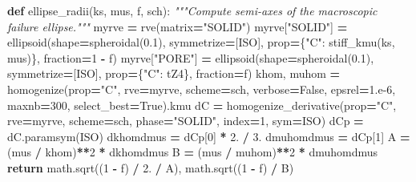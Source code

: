 \documentclass[
  a4paper,
  numbers=noendperiod,
  DIV=12]{scrreprt}
\newenvironment{Shaded}{\begin{snugshade}}{\end{snugshade}}
\newcommand{\CommentTok}[1]{\textcolor[rgb]{0.56,0.35,0.01}{\textit{#1}}}
\newcommand{\ControlFlowTok}[1]{\textcolor[rgb]{0.13,0.29,0.53}{\textbf{#1}}}
\newcommand{\DecValTok}[1]{\textcolor[rgb]{0.00,0.00,0.81}{#1}}
\newcommand{\FloatTok}[1]{\textcolor[rgb]{0.00,0.00,0.81}{#1}}
\newcommand{\KeywordTok}[1]{\textcolor[rgb]{0.13,0.29,0.53}{\textbf{#1}}}
\newcommand{\NormalTok}[1]{#1}
\newcommand{\OperatorTok}[1]{\textcolor[rgb]{0.81,0.36,0.00}{\textbf{#1}}}
\newcommand{\StringTok}[1]{\textcolor[rgb]{0.31,0.60,0.02}{#1}}
\newcommand{\VariableTok}[1]{\textcolor[rgb]{0.00,0.00,0.00}{#1}}
\begin{document}
\begin{Shaded}
\begin{Highlighting}[]
\KeywordTok{def}\NormalTok{ ellipse\_radii(ks, mus, f, sch):}
    \CommentTok{"""Compute semi{-}axes of the macroscopic failure ellipse."""}
\NormalTok{    myrve }\OperatorTok{=}\NormalTok{ rve(matrix}\OperatorTok{=}\StringTok{"SOLID"}\NormalTok{)}
\NormalTok{    myrve[}\StringTok{"SOLID"}\NormalTok{] }\OperatorTok{=}\NormalTok{ ellipsoid(shape}\OperatorTok{=}\NormalTok{spheroidal(}\FloatTok{0.1}\NormalTok{), symmetrize}\OperatorTok{=}\NormalTok{[ISO],}
\NormalTok{                               prop}\OperatorTok{=}\NormalTok{\{}\StringTok{"C"}\NormalTok{: stiff\_kmu(ks, mus)\}, fraction}\OperatorTok{=}\DecValTok{1} \OperatorTok{{-}}\NormalTok{ f)}
\NormalTok{    myrve[}\StringTok{"PORE"}\NormalTok{] }\OperatorTok{=}\NormalTok{ ellipsoid(shape}\OperatorTok{=}\NormalTok{spheroidal(}\FloatTok{0.1}\NormalTok{), symmetrize}\OperatorTok{=}\NormalTok{[ISO],}
\NormalTok{                              prop}\OperatorTok{=}\NormalTok{\{}\StringTok{"C"}\NormalTok{: tZ4\}, fraction}\OperatorTok{=}\NormalTok{f)}
\NormalTok{    khom, muhom }\OperatorTok{=}\NormalTok{ homogenize(prop}\OperatorTok{=}\StringTok{"C"}\NormalTok{, rve}\OperatorTok{=}\NormalTok{myrve, scheme}\OperatorTok{=}\NormalTok{sch,}
\NormalTok{                             verbose}\OperatorTok{=}\VariableTok{False}\NormalTok{, epsrel}\OperatorTok{=}\FloatTok{1.e{-}6}\NormalTok{, maxnb}\OperatorTok{=}\DecValTok{300}\NormalTok{,}
\NormalTok{                             select\_best}\OperatorTok{=}\VariableTok{True}\NormalTok{).kmu}
\NormalTok{    dC }\OperatorTok{=}\NormalTok{ homogenize\_derivative(prop}\OperatorTok{=}\StringTok{"C"}\NormalTok{, rve}\OperatorTok{=}\NormalTok{myrve, scheme}\OperatorTok{=}\NormalTok{sch,}
\NormalTok{                               phase}\OperatorTok{=}\StringTok{"SOLID"}\NormalTok{, index}\OperatorTok{=}\DecValTok{1}\NormalTok{, sym}\OperatorTok{=}\NormalTok{ISO)}
\NormalTok{    dCp }\OperatorTok{=}\NormalTok{ dC.paramsym(ISO)}
\NormalTok{    dkhomdmus }\OperatorTok{=}\NormalTok{ dCp[}\DecValTok{0}\NormalTok{] }\OperatorTok{*} \FloatTok{2.} \OperatorTok{/} \FloatTok{3.}
\NormalTok{    dmuhomdmus }\OperatorTok{=}\NormalTok{ dCp[}\DecValTok{1}\NormalTok{]}
\NormalTok{    A }\OperatorTok{=}\NormalTok{ (mus }\OperatorTok{/}\NormalTok{ khom)}\OperatorTok{**}\DecValTok{2} \OperatorTok{*}\NormalTok{ dkhomdmus}
\NormalTok{    B }\OperatorTok{=}\NormalTok{ (mus }\OperatorTok{/}\NormalTok{ muhom)}\OperatorTok{**}\DecValTok{2} \OperatorTok{*}\NormalTok{ dmuhomdmus}
    \ControlFlowTok{return}\NormalTok{ math.sqrt((}\DecValTok{1} \OperatorTok{{-}}\NormalTok{ f) }\OperatorTok{/} \FloatTok{2.} \OperatorTok{/}\NormalTok{ A), math.sqrt((}\DecValTok{1} \OperatorTok{{-}}\NormalTok{ f) }\OperatorTok{/}\NormalTok{ B)}


\end{Highlighting}
\end{Shaded}
\end{document}

